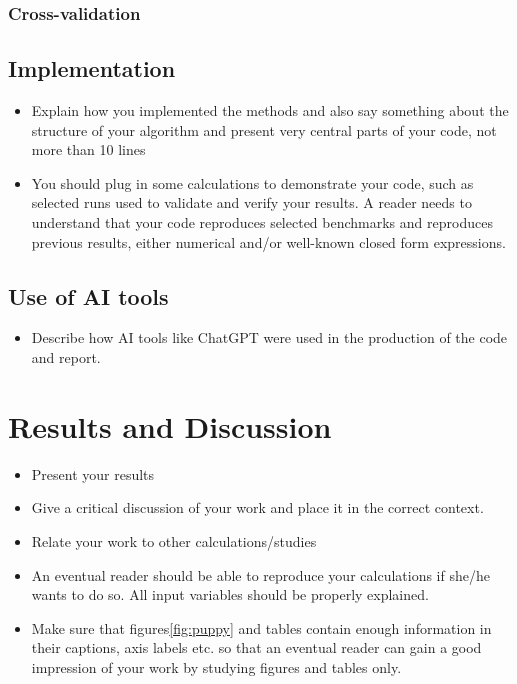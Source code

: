 \documentclass[amssymb,twocolumn,aps]{revtex4}
\begin{document}
\subsubsection{Cross-validation}



\subsection{Implementation}

\begin{itemize}
    \item Explain how you implemented the methods and also say something about the structure of your algorithm and present very central parts of your code, not more than 10 lines
    \item You should plug in some calculations to demonstrate your code, such as selected runs used to validate and verify your results. A reader needs to understand that your code reproduces selected benchmarks and reproduces previous results, either numerical and/or well-known closed form expressions.
\end{itemize}

\subsection{Use of AI tools}

\begin{itemize}
    \item Describe how AI tools like ChatGPT were used in the production of the code and report.
\end{itemize}

\section{Results and Discussion}\label{section:results}

\begin{itemize}
    \item Present your results
    \item Give a critical discussion of your work and place it in the correct context.
    \item Relate your work to other calculations/studies
    \item An eventual reader should be able to reproduce your calculations if she/he wants to do so. All input variables should be properly explained.
    \item Make sure that figures\ref{fig:puppy} and tables contain enough information in their captions, axis labels etc. so that an eventual reader can gain a good impression of your work by studying figures and tables only.
\end{itemize}
\end{document}
